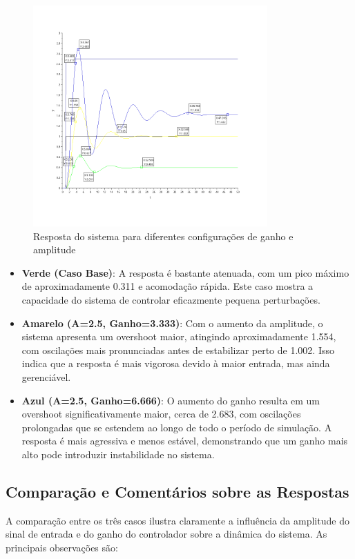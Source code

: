 \begin{figure}[H]
    \centering
    \includegraphics[width=0.8\textwidth]{atividades/5-atividade/assets/simulation-c.png}
    \caption{Resposta do sistema para diferentes configurações de ganho e amplitude}
    \label{fig:response_comparison}
\end{figure}

\begin{itemize}
    \item \textbf{Verde (Caso Base)}: A resposta é bastante atenuada, com um pico máximo de aproximadamente 0.311 e acomodação rápida. Este caso mostra a capacidade do sistema de controlar eficazmente pequena perturbações.

    \item \textbf{Amarelo (A=2.5, Ganho=3.333)}: Com o aumento da amplitude, o sistema apresenta um overshoot maior, atingindo aproximadamente 1.554, com oscilações mais pronunciadas antes de estabilizar perto de 1.002. Isso indica que a resposta é mais vigorosa devido à maior entrada, mas ainda gerenciável.

    \item \textbf{Azul (A=2.5, Ganho=6.666)}: O aumento do ganho resulta em um overshoot significativamente maior, cerca de 2.683, com oscilações prolongadas que se estendem ao longo de todo o período de simulação. A resposta é mais agressiva e menos estável, demonstrando que um ganho mais alto pode introduzir instabilidade no sistema.
\end{itemize}

\subsection{Comparação e Comentários sobre as Respostas}
A comparação entre os três casos ilustra claramente a influência da amplitude do sinal de entrada e do ganho do controlador sobre a dinâmica do sistema. As principais observações são:

